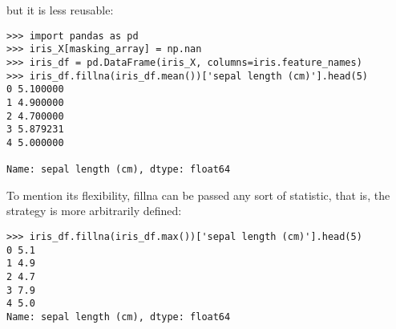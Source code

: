 \documentclass[SKL-MASTER.tex]{subfiles}
\begin{document}
but it is less reusable:
\begin{framed}
\begin{verbatim}
>>> import pandas as pd
>>> iris_X[masking_array] = np.nan
>>> iris_df = pd.DataFrame(iris_X, columns=iris.feature_names)
>>> iris_df.fillna(iris_df.mean())['sepal length (cm)'].head(5)
0 5.100000
1 4.900000
2 4.700000
3 5.879231
4 5.000000

Name: sepal length (cm), dtype: float64
\end{verbatim}
\end{framed}


To mention its flexibility, fillna can be passed any sort of statistic, that is, the strategy is
more arbitrarily defined:
\begin{framed}
	\begin{verbatim}
>>> iris_df.fillna(iris_df.max())['sepal length (cm)'].head(5)
0 5.1
1 4.9
2 4.7
3 7.9
4 5.0
Name: sepal length (cm), dtype: float64
\end{verbatim}
\end{framed}
\end{document}
